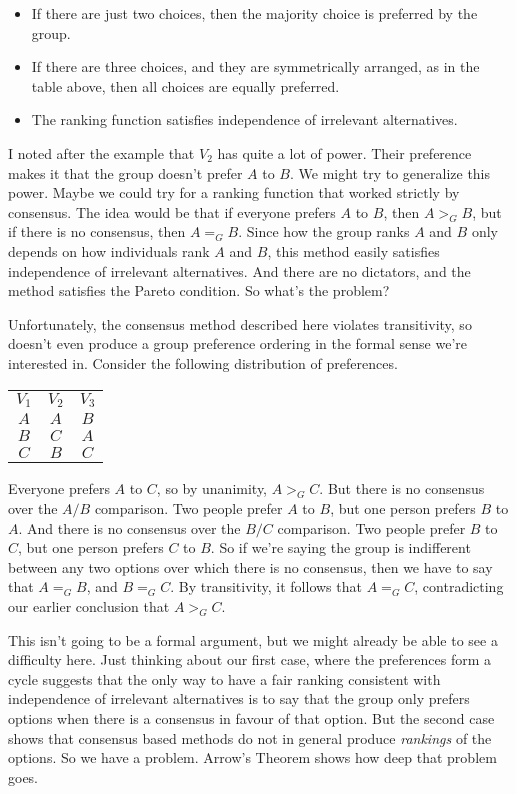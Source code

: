 \begin{multicols}{2}
\begin{itemize}
\item If there are just two choices, then the majority choice is preferred by the group.
\item If there are three choices, and they are symmetrically arranged, as in the table above, then all choices are equally preferred.
\item The ranking function satisfies independence of irrelevant alternatives.
\end{itemize}
I noted after the example that $V_2$ has quite a lot of power. Their preference makes it that the group doesn't prefer $A$ to $B$. We might try to generalize this power. Maybe we could try for a ranking function that worked strictly by consensus. The idea would be that if everyone prefers $A$ to $B$, then $A >_G B$, but if there is no consensus, then $A =_G B$. Since how the group ranks $A$ and $B$ only depends on how individuals rank $A$ and $B$, this method easily satisfies independence of irrelevant alternatives. And there are no dictators, and the method satisfies the Pareto condition. So what's the problem?

Unfortunately, the consensus method described here violates transitivity, so doesn't even produce a group preference ordering in the formal sense we're interested in. Consider the following distribution of preferences.

\begin{center}
\begin{tabular}{c c c}
$V_1$ & $V_2$ & $V_3$ \\ 
$A$ & $A$ & $B$ \\
$B$ & $C$ & $A$ \\
$C$ & $B$ & $C$
\end{tabular}
\end{center}
Everyone prefers $A$ to $C$, so by unanimity, $A >_G C$. But there is no consensus over the $A/B$ comparison. Two people prefer $A$ to $B$, but one person prefers $B$ to $A$. And there is no consensus over the $B/C$ comparison. Two people prefer $B$ to $C$, but one person prefers $C$ to $B$. So if we're saying the group is indifferent between any two options over which there is no consensus, then we have to say that $A =_G B$, and $B =_G C$. By transitivity, it follows that $A =_G C$, contradicting our earlier conclusion that $A >_G C$.

This isn't going to be a formal argument, but we might already be able to see a difficulty here. Just thinking about our first case, where the preferences form a cycle suggests that the only way to have a fair ranking consistent with independence of irrelevant alternatives is to say that the group only prefers options when there is a consensus in favour of that option. But the second case shows that consensus based methods do not in general produce \textit{rankings} of the options. So we have a problem. Arrow's Theorem shows how deep that problem goes.



\end{multicols}
